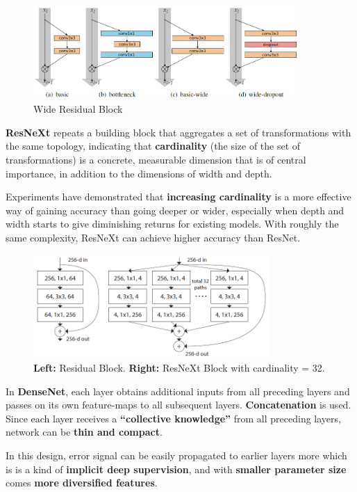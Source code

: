 \documentclass[a4paper, 11pt]{article} %
\begin{document}
\begin{figure}[H]
	\centering
	\includegraphics[width=0.9\textwidth]{./img/wrn.png}
	\caption{Wide Residual Block}
\end{figure}

\textbf{ResNeXt} repeats a building block that aggregates a set of transformations with the
same topology, indicating that \textbf{cardinality} (the size of the set of transformations)
is a concrete, measurable dimension that is of central importance, in addition to the
dimensions of width and depth.

Experiments have demonstrated that \textbf{increasing cardinality} is a more effective way
of gaining accuracy than going deeper or wider, especially when depth and width starts to
give diminishing returns for existing models. With roughly the same complexity, ResNeXt
can achieve higher accuracy than ResNet.

\begin{figure}[H]
	\centering
	\includegraphics[width=0.8\textwidth]{./img/resnext.png}
	\caption{\textbf{Left:} Residual Block. \textbf{Right:} ResNeXt Block with cardinality = 32.}
\end{figure}

In \textbf{DenseNet}, each layer obtains additional inputs from all preceding layers and
passes on its own feature-maps to all subsequent layers. \textbf{Concatenation} is used.
Since each layer receives a \textbf{“collective knowledge”} from all preceding layers,
network can be \textbf{thin and compact}.

In this design, error signal can be easily propagated to earlier layers more which is is a
kind of \textbf{implicit deep supervision}, and with \textbf{smaller parameter size} comes
\textbf{more diversified features}.
\end{document}
